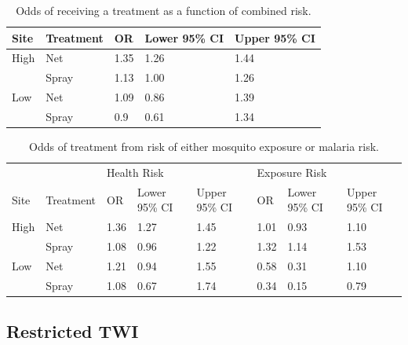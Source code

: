 \documentclass{article}\usepackage[]{graphicx}\usepackage[]{color}
\begin{document}
{\begin{table}[ht]
\centering
\begin{tabular}{lllll}
  \hline 
Site & Treatment & OR & Lower 95\% CI & Upper 95\% CI \\ 
  \hline
High & Net & 1.35 & 1.26 & 1.44 \\ 
   & Spray & 1.13 & 1.00 & 1.26 \\ 
  Low & Net & 1.09 & 0.86 & 1.39 \\ 
   & Spray & 0.9 & 0.61 & 1.34 \\ 
   \hline
\end{tabular}
\caption{Odds of receiving a treatment as a function of combined risk.} 
\label{ORcmb}
\end{table}





\begin{table}[ht]
\centering
\begin{tabular}{llllllll}
  \hline
 &  & \multicolumn{3}{l}{Health Risk} & \multicolumn{3}{l}{Exposure Risk}  \\ 
  
Site & Treatment & OR & Lower 95\% CI & Upper 95\% CI & OR & Lower 95\% CI & Upper 95\% CI \\ 
 \hline
  High & Net & 1.36 & 1.27 & 1.45 & 1.01 & 0.93 & 1.10 \\ 
   & Spray & 1.08 & 0.96 & 1.22 & 1.32 & 1.14 & 1.53 \\ 
  Low & Net & 1.21 & 0.94 & 1.55 & 0.58 & 0.31 & 1.10 \\ 
   & Spray & 1.08 & 0.67 & 1.74 & 0.34 & 0.15 & 0.79 \\ 
   \hline
\end{tabular}
\caption{Odds of treatment from risk of either mosquito exposure or malaria risk.} 
\label{ORtrt}
\end{table}





















\subsection{Restricted TWI}

}
\end{document}
